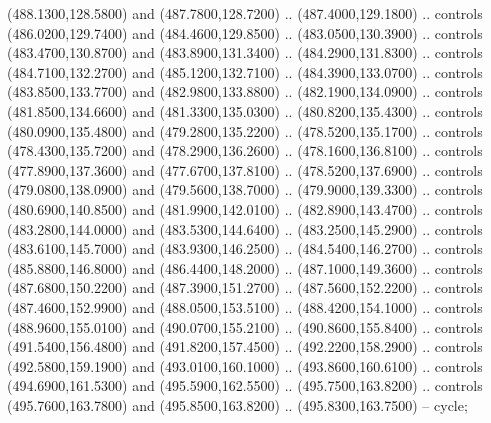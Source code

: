 {\begin{scope}[y=0.80pt, x=0.80pt, yscale=-1, xscale=1, inner sep=0pt, outer sep=0pt, #1]
      (488.1300,128.5800) and (487.7800,128.7200) .. (487.4000,129.1800) .. controls
      (486.0200,129.7400) and (484.4600,129.8500) .. (483.0500,130.3900) .. controls
      (483.4700,130.8700) and (483.8900,131.3400) .. (484.2900,131.8300) .. controls
      (484.7100,132.2700) and (485.1200,132.7100) .. (484.3900,133.0700) .. controls
      (483.8500,133.7700) and (482.9800,133.8800) .. (482.1900,134.0900) .. controls
      (481.8500,134.6600) and (481.3300,135.0300) .. (480.8200,135.4300) .. controls
      (480.0900,135.4800) and (479.2800,135.2200) .. (478.5200,135.1700) .. controls
      (478.4300,135.7200) and (478.2900,136.2600) .. (478.1600,136.8100) .. controls
      (477.8900,137.3600) and (477.6700,137.8100) .. (478.5200,137.6900) .. controls
      (479.0800,138.0900) and (479.5600,138.7000) .. (479.9000,139.3300) .. controls
      (480.6900,140.8500) and (481.9900,142.0100) .. (482.8900,143.4700) .. controls
      (483.2800,144.0000) and (483.5300,144.6400) .. (483.2500,145.2900) .. controls
      (483.6100,145.7000) and (483.9300,146.2500) .. (484.5400,146.2700) .. controls
      (485.8800,146.8000) and (486.4400,148.2000) .. (487.1000,149.3600) .. controls
      (487.6800,150.2200) and (487.3900,151.2700) .. (487.5600,152.2200) .. controls
      (487.4600,152.9900) and (488.0500,153.5100) .. (488.4200,154.1000) .. controls
      (488.9600,155.0100) and (490.0700,155.2100) .. (490.8600,155.8400) .. controls
      (491.5400,156.4800) and (491.8200,157.4500) .. (492.2200,158.2900) .. controls
      (492.5800,159.1900) and (493.0100,160.1000) .. (493.8600,160.6100) .. controls
      (494.6900,161.5300) and (495.5900,162.5500) .. (495.7500,163.8200) .. controls
      (495.7600,163.7800) and (495.8500,163.8200) .. (495.8300,163.7500) -- cycle;


\end{scope}}
